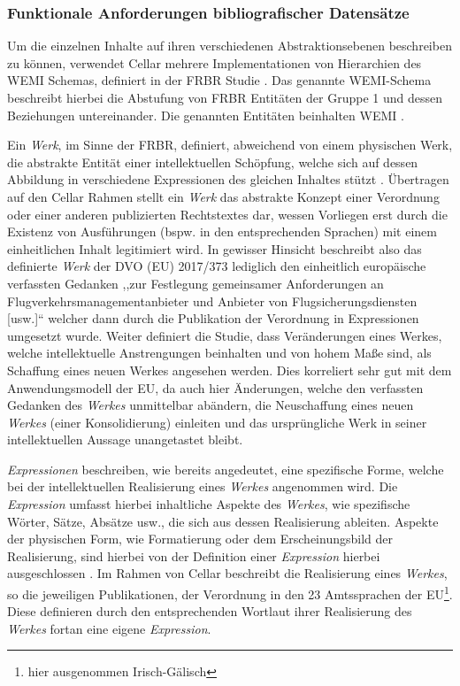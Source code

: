     \subsubsection{Funktionale Anforderungen bibliografischer Datensätze}\label{frbr}
    
Um die einzelnen Inhalte auf ihren verschiedenen Abstraktionsebenen beschreiben zu können, verwendet Cellar mehrere Implementationen von Hierarchien des \acs{WEMI} Schemas, definiert in der \ac{FRBR}  Studie \cite[S. 29f]{eu_cellar}.
Das genannte \acs{WEMI}-Schema beschreibt hierbei die Abstufung von \ac{FRBR} Entitäten der Gruppe 1 und dessen Beziehungen untereinander. 
Die genannten Entitäten beinhalten \ac{WEMI} \cite[12]{eu_frbr}.

Ein \textit{Werk}, im Sinne der \ac{FRBR}, definiert, abweichend von einem physischen Werk, die abstrakte Entität einer intellektuellen Schöpfung, welche sich auf dessen Abbildung in verschiedene Expressionen des gleichen Inhaltes stützt \cite[S. 16f]{eu_frbr}.
Übertragen auf den Cellar Rahmen stellt ein \textit{Werk} das abstrakte Konzept einer Verordnung oder einer anderen publizierten Rechtstextes dar, wessen Vorliegen erst durch die Existenz von Ausführungen (bspw. in den entsprechenden Sprachen) mit einem einheitlichen Inhalt legitimiert wird. 
In gewisser Hinsicht beschreibt also das definierte \textit{Werk} der \acs{DVO} (\acs{EU}) 2017/373 lediglich den einheitlich europäische verfassten Gedanken ,,zur Festlegung gemeinsamer Anforderungen an Flugverkehrsmanagementanbieter und Anbieter von Flugsicherungsdiensten [usw.]`` welcher dann durch die Publikation der Verordnung in Expressionen umgesetzt wurde.
Weiter definiert die Studie, dass Veränderungen eines Werkes, welche intellektuelle Anstrengungen beinhalten und von hohem Maße sind, als Schaffung eines neuen Werkes angesehen werden. \cite[17]{eu_frbr} 
Dies korreliert sehr gut mit dem Anwendungsmodell der \ac{EU}, da auch hier Änderungen, welche den verfassten Gedanken des \textit{Werkes} unmittelbar abändern, die Neuschaffung eines neuen \textit{Werkes} (einer Konsolidierung) einleiten und das ursprüngliche Werk in seiner intellektuellen Aussage unangetastet bleibt.


\textit{Expressionen} beschreiben, wie bereits angedeutet, eine spezifische Forme, welche bei der intellektuellen Realisierung eines \textit{Werkes} angenommen wird.
Die \textit{Expression} umfasst hierbei inhaltliche Aspekte des \textit{Werkes}, wie spezifische Wörter, Sätze, Absätze usw., die sich aus dessen Realisierung ableiten. 
Aspekte der physischen Form, wie Formatierung oder dem Erscheinungsbild der Realisierung, sind hierbei von der Definition einer \textit{Expression} hierbei ausgeschlossen \cite[S. 18f]{eu_frbr}.
Im Rahmen von Cellar beschreibt die Realisierung eines \textit{Werkes}, so die jeweiligen Publikationen, der Verordnung in den 23 Amtssprachen der EU\footnote{hier ausgenommen Irisch-Gälisch}.
Diese definieren durch den entsprechenden Wortlaut ihrer Realisierung des \textit{Werkes} fortan eine eigene \textit{Expression}.


